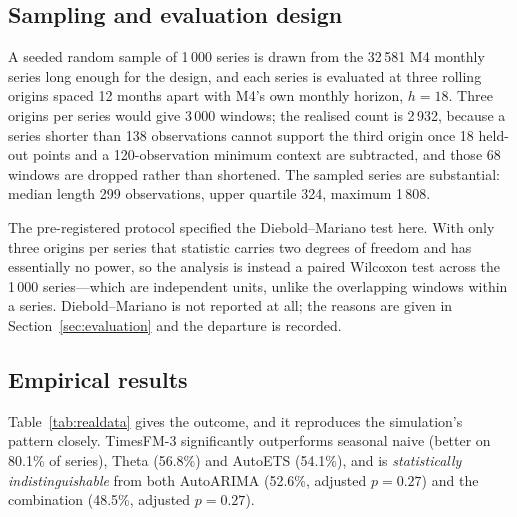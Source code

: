 \documentclass[article]{ajs}
\providecommand{\sectionref}[1]{Section~\ref{#1}}
\providecommand{\tableref}[1]{Table~\ref{#1}}
\begin{document}
\subsection{Sampling and evaluation design}
\label{sec:m4design}

A seeded random sample of 1\,000 series is drawn from the 32\,581 M4 monthly series long enough
for the design, and each series is evaluated at three rolling origins spaced 12 months apart with M4's own
monthly horizon, $h = 18$. Three origins per series would give 3\,000 windows; the realised
count is 2\,932, because a series shorter than 138 observations cannot support the third
origin once 18 held-out points and a 120-observation minimum context are subtracted, and those
68 windows are dropped rather than shortened. The sampled series are substantial: median
length 299 observations, upper quartile 324, maximum 1\,808.

The pre-registered protocol specified the Diebold--Mariano test here. With only three origins per
series that statistic carries two degrees of freedom and has essentially no power, so the analysis
is instead a paired Wilcoxon test across the 1\,000 series---which are independent units, unlike
the overlapping windows within a series. Diebold--Mariano is not reported at all; the reasons are
given in \sectionref{sec:evaluation} and the departure is recorded.

\subsection{Empirical results}
\label{sec:m4results}

\tableref{tab:realdata} gives the outcome, and it reproduces the simulation's pattern closely.
TimesFM-3 significantly outperforms seasonal naive (better on 80.1\% of series), Theta (56.8\%)
and AutoETS (54.1\%), and is \emph{statistically indistinguishable} from both AutoARIMA (52.6\%,
adjusted $p = 0.27$) and the combination (48.5\%, adjusted $p = 0.27$).
\end{document}
